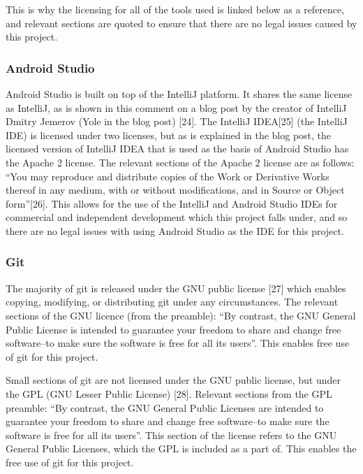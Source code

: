 \documentclass{article}
\begin{document}
This is why the licensing for all of the tools used is linked below as a reference, and relevant sections are quoted to ensure that there are no legal issues caused by this project. \par

\subsubsection{Android Studio}

Android Studio is built on top of the IntelliJ platform. It shares the same license as IntelliJ, as is shown in this comment on a blog post by the creator of IntelliJ Dmitry Jemerov (Yole in the blog post) [24]. The IntelliJ IDEA[25] (the IntelliJ IDE) is licensed under two licenses, but as is explained in the blog post, the licensed version of IntelliJ IDEA that is used as the basis of Android Studio has the Apache 2 license. The relevant sections of the Apache 2 license are as follows: ``You may reproduce and distribute copies of the Work or Derivative Works thereof in any medium, with or without modifications, and in Source or Object form''[26]. This allows for the use of the IntelliJ and Android Studio IDEs for commercial and independent development which this project falls under, and so there are no legal issues with using Android Studio as the IDE for this project. \par

\subsubsection{Git}

The majority of git is released under the GNU public license [27] which enables copying, modifying, or distributing git under any circumstances. The relevant sections of the GNU licence (from the preamble): ``By contrast, the GNU General Public License is intended to guarantee your freedom to share and change free software--to make sure the software is free for all its users''. This enables free use of git for this project. \par

Small sections of git are not licensed under the GNU public license, but under the GPL (GNU Lesser Public License) [28]. Relevant sections from the GPL preamble: ``By contrast, the GNU General Public Licenses are intended to guarantee your freedom to share and change free software--to make sure the software is free for all its users''. This section of the license refers to the GNU General Public Licenses, which the GPL is included as a part of. This enables the free use of git for this project. \par
\end{document}
